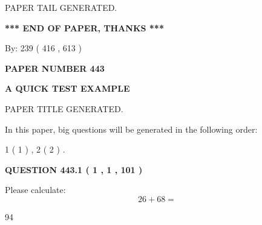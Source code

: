 \documentclass[12pt]{article}
\begin{document}
\vspace{2.0in} PAPER TAIL GENERATED.
   
   
   
   
\vspace{1.0in} 
{\textbf{\large{ *** END OF PAPER, THANKS *** }}} 
   
   
\hspace{1.0in} By: 
 239 ( 416 ,  613 )
   
   
   
   
\newpage 
\setcounter{page}{ 
   443001 } 
   
   
   
   
 {\textbf{ \Large{ PAPER NUMBER  443  }}}
   
   
\vspace{0.2in}
   
   
   
   
   
   
   
   
 \vspace{0.2in}
{\LARGE {\textbf{ A QUICK TEST EXAMPLE}}}
   
   
 PAPER TITLE GENERATED.
   
   
   
\vspace{0.2in}
   
In this paper, big questions will be generated in the following order: 
   
   
   1 ( 1 )
 ,
   2 ( 2 )
 .
  
\vspace{0.2in}
  
{\textbf{\Large{QUESTION
443.1 
 ( 1 , 1 , 101 )
}}}
  
  
 
Please calculate:
\begin{equation}
26 +  %
68 = \nonumber
\end{equation}
 
 
 
\noindent{}
 
 

94
 
 
\noindent{}
 
 

 
 
\end{document}

